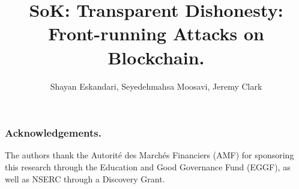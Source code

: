 \documentclass[envcountsect]{llncs}
\begin{document}
\frontmatter
\mainmatter

\title{SoK: Transparent Dishonesty: Front-running Attacks on Blockchain.}

\author{
	Shayan Eskandari\inst{\dag\ddag},
	Seyedehmahsa Moosavi\inst{\dag},
	Jeremy Clark\inst{\dag}
	}

	
	
\maketitle








\subsubsection*{Acknowledgements.}
The authors thank the Autorit\'e des March\'es Financiers (AMF) for sponsoring this research through the Education and Good Governance Fund (EGGF), as well as NSERC through a Discovery Grant. 





%
\end{document}
